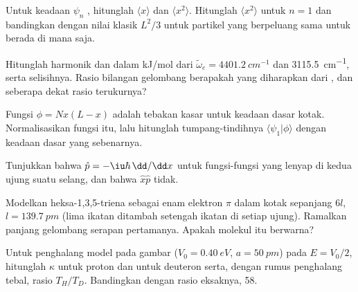 \begin{exercise}[$\star\star$]\label{exo:b3:quantum-model-systems:5}
Untuk keadaan $\psi_n$ , hitunglah $\langle x\rangle$ dan
$\langle x^2\rangle$. Hitunglah $\langle x^2\rangle$ untuk $n = 1$ dan
bandingkan dengan nilai klasik $L^2/3$ untuk partikel yang berpeluang sama
untuk berada di mana saja.
\end{exercise}

\begin{exercise}[$\star\star$]\label{exo:b3:quantum-model-systems:6}
Hitunglah  harmonik  dan  dalam
\unit{kJ/mol} dari $\tilde\omega_e = \qty{4401.2}{cm^{-1}}$ dan
\qty{3115.5}{cm^{-1}}, serta selisihnya. Rasio bilangan gelombang berapakah
yang diharapkan dari , dan seberapa dekat rasio terukurnya?
\end{exercise}

\begin{exercise}[$\star\star$]\label{exo:b3:quantum-model-systems:7}
Fungsi $\phi = Nx(L - x)$ adalah tebakan kasar untuk keadaan dasar kotak.
Normalisasikan fungsi itu, lalu hitunglah tumpang-tindihnya
$\langle\psi_1|\phi\rangle$ dengan keadaan dasar yang sebenarnya.
\end{exercise}

\begin{exercise}[$\star\star$]\label{exo:b3:quantum-model-systems:8}
Tunjukkan bahwa $\hat p = -\iu\hbar\,\dd/\dd x$  untuk fungsi-fungsi
yang lenyap di kedua ujung suatu selang, dan bahwa $\hat x\hat p$ tidak.
\end{exercise}

\begin{exercise}[$\star\star$]\label{exo:b3:quantum-model-systems:9}
Modelkan heksa-1,3,5-triena sebagai enam elektron $\pi$ dalam kotak sepanjang
$6l$, $l =
\qty{139.7}{pm}$ (lima ikatan ditambah setengah ikatan di setiap
ujung). Ramalkan panjang gelombang serapan pertamanya. Apakah molekul itu
berwarna?
\end{exercise}

\begin{exercise}[$\star\star\star$]\label{exo:b3:quantum-model-systems:10}
Untuk penghalang model pada gambar ($V_0 = \qty{0.40}{eV}$, $a = \qty{50}{pm}$)
pada $E = V_0/2$, hitunglah $\kappa$ untuk proton dan untuk deuteron serta,
dengan rumus penghalang tebal, rasio $T_H/T_D$. Bandingkan dengan rasio
eksaknya, 58.
\end{exercise}

